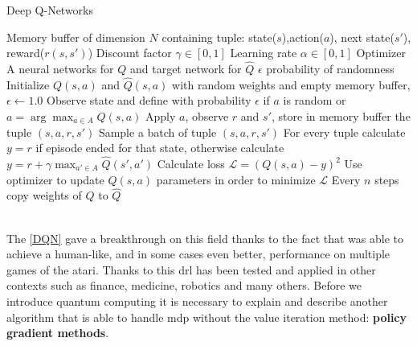 \begin{algorithm} \label{DQN}
	\caption{Deep Q-Networks}
	\begin{algorithmic}
	\REQUIRE Memory buffer of dimension $N$ containing tuple: state($s$),action($a$), next state($s'$), reward($r(s,s')$)
	\REQUIRE Discount factor $\gamma \in [0,1]$
	\REQUIRE Learning rate  $\alpha \in  [0,1]$
	\REQUIRE Optimizer
	\REQUIRE A neural networks for $Q$ and target network for $\hat{Q}$
	\REQUIRE $\epsilon$ probability of randomness
	\STATE Initialize $Q(s,a)$ and $\hat{Q}(s,a)$ with random weights and empty memory buffer, $\epsilon \leftarrow 1.0$
	\STATE Observe state and define with probability $\epsilon$ if $a$ is random or $a = \arg \max_{a \in A} Q(s,a)$
	\STATE Apply $a$, observe $r$ and $s'$, store in memory buffer the tuple $(s,a,r,s')$
	\STATE Sample a batch of tuple $(s,a,r,s')$
	\STATE For every tuple calculate $y = r$ if episode ended for that state, otherwise calculate $y = r + \gamma \max_{a' \in A} \hat{Q}(s',a')$
	\STATE Calculate loss $\mathcal{L} = (Q(s,a) - y)^2$
	\STATE Use optimizer to update $Q(s,a)$ parameters in order to minimize $\mathcal{L}$ 
	\STATE Every $n$ steps copy weights of $Q$ to $\hat{Q}$
	\ENDWHILE		
	\end{algorithmic}
\end{algorithm}\\

The \ref{DQN} gave a breakthrough on this field thanks to the fact that was able to achieve a human-like, and in some cases even better, performance on multiple games of the atari. Thanks to this \acrlong{drl} has been tested and applied in other contexts such as finance, medicine, robotics and many others. Before we introduce quantum computing it is necessary to explain and describe another algorithm that is able to handle \acrlong{mdp} without the value iteration method: \textbf{policy gradient methods}.
